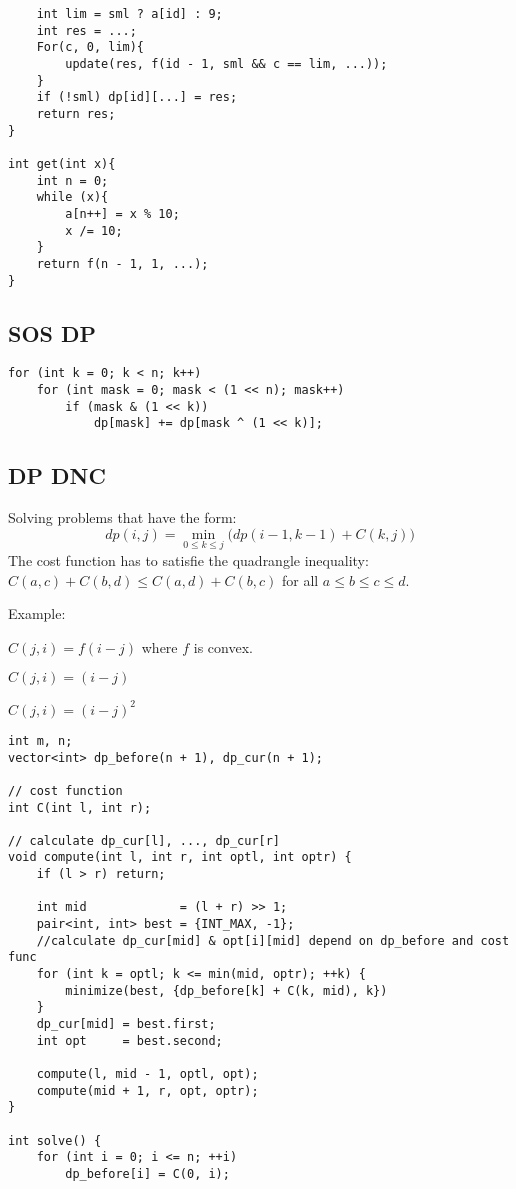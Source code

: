 \documentclass[11pt,a4paper]{article}
\begin{document}
\begin{multicols*}{2}
\begin{lstlisting}
    int lim = sml ? a[id] : 9;
    int res = ...;
    For(c, 0, lim){
        update(res, f(id - 1, sml && c == lim, ...));
    }
    if (!sml) dp[id][...] = res;
    return res;
}

int get(int x){
    int n = 0;
    while (x){
        a[n++] = x % 10;
        x /= 10;
    }
    return f(n - 1, 1, ...);
}
\end{lstlisting}

\subsection{SOS DP}
\begin{lstlisting}
for (int k = 0; k < n; k++)
    for (int mask = 0; mask < (1 << n); mask++)
        if (mask & (1 << k)) 
            dp[mask] += dp[mask ^ (1 << k)];
\end{lstlisting}

\subsection{DP DNC}

Solving problems that have the form:
\[
dp(i, j) =
\min\limits_{0 \le k \le j} \Big( dp(i - 1, k - 1) + C(k, j) \Big)
\]
The cost function has to satisfie the quadrangle inequality:
$C(a, c) + C(b, d) \leq C(a, d) + C(b, c)$ for all $a \leq b \leq c \leq d$.

Example:

$C(j, i) = f(i - j)$ where $f$ is convex.

$C(j, i) = (i - j)$

$C(j, i) = (i - j)^2$
\begin{lstlisting}
int m, n;
vector<int> dp_before(n + 1), dp_cur(n + 1);

// cost function
int C(int l, int r);

// calculate dp_cur[l], ..., dp_cur[r]
void compute(int l, int r, int optl, int optr) {
    if (l > r) return;

    int mid             = (l + r) >> 1;
    pair<int, int> best = {INT_MAX, -1};
    //calculate dp_cur[mid] & opt[i][mid] depend on dp_before and cost func
    for (int k = optl; k <= min(mid, optr); ++k) {
        minimize(best, {dp_before[k] + C(k, mid), k})
    }
    dp_cur[mid] = best.first;
    int opt     = best.second;

    compute(l, mid - 1, optl, opt);
    compute(mid + 1, r, opt, optr);
}

int solve() {
    for (int i = 0; i <= n; ++i)
        dp_before[i] = C(0, i);


\end{lstlisting}
\end{multicols*}
\end{document}
